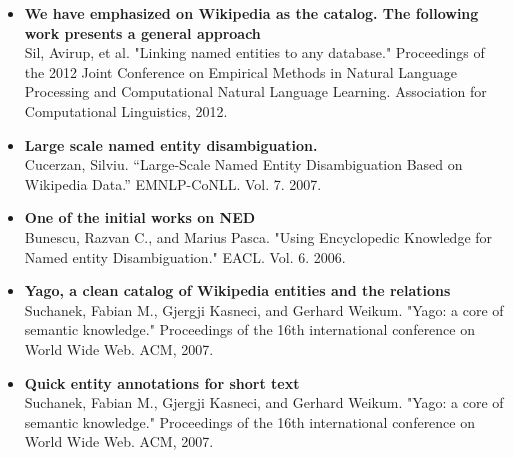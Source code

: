 \documentclass[a4paper,10pt]{report}
\begin{document}
\begin{itemize}
 \item \textbf{We have emphasized on Wikipedia as the catalog. The following work presents a general approach} \\
 Sil, Avirup, et al. "Linking named entities to any database." Proceedings of the 2012 Joint Conference on Empirical Methods in Natural Language Processing and Computational Natural Language Learning. Association for Computational Linguistics, 2012.
 \item \textbf{Large scale named entity disambiguation.} \\
 Cucerzan, Silviu. ``Large-Scale Named Entity Disambiguation Based on Wikipedia Data.'' EMNLP-CoNLL. Vol. 7. 2007.
 \item \textbf{One of the initial works on NED} \\
 Bunescu, Razvan C., and Marius Pasca. "Using Encyclopedic Knowledge for Named entity Disambiguation." EACL. Vol. 6. 2006.
 \item \textbf{Yago, a clean catalog of Wikipedia entities and the relations } \\
 Suchanek, Fabian M., Gjergji Kasneci, and Gerhard Weikum. "Yago: a core of semantic knowledge." Proceedings of the 16th international conference on World Wide Web. ACM, 2007.
 \item \textbf{Quick entity annotations for short text} \\
 Suchanek, Fabian M., Gjergji Kasneci, and Gerhard Weikum. "Yago: a core of semantic knowledge." Proceedings of the 16th international conference on World Wide Web. ACM, 2007.
\end{itemize}



\end{document}
